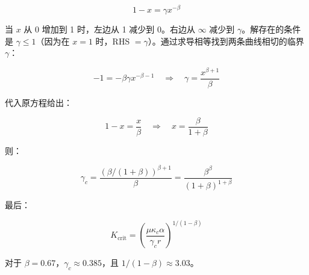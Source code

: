 \documentclass[12pt,a4paper]{article}
\theoremstyle{remark}
\newcommand{\kappac}{\kappa_c}
\begin{document}
		\begin{equation}
			1 - x = \gamma x^{-\beta}
			\label{eq:x-eqn}
		\end{equation}
		
		当 $x$ 从 0 增加到 1 时，左边从 1 减少到 0。右边从 $\infty$ 减少到 $\gamma$。解存在的条件是 $\gamma \leq 1$（因为在 $x=1$ 时，RHS $=\gamma$）。通过求导相等找到两条曲线相切的临界 $\gamma$：
		
		\begin{equation}
			-1 = -\beta \gamma x^{-\beta-1} \quad \Rightarrow \quad \gamma = \frac{x^{\beta+1}}{\beta}
			\label{eq:derivative}
		\end{equation}
		
		代入原方程给出：
		
		\begin{equation}
			1 - x = \frac{x}{\beta} \quad \Rightarrow \quad x = \frac{\beta}{1+\beta}
			\label{eq:x-crit}
		\end{equation}
		
		则：
		
		\begin{equation}
			\gamma_c = \frac{(\beta/(1+\beta))^{\beta+1}}{\beta} = \frac{\beta^{\beta}}{(1+\beta)^{1+\beta}}
			\label{eq:gamma-c-app}
		\end{equation}
		
		最后：
		
		\begin{equation}
			K_{\text{crit}} = \left( \frac{\mu \kappac \alpha}{\gamma_c r} \right)^{1/(1-\beta)}
			\label{eq:Kcrit-app}
		\end{equation}
		
		对于 $\beta = 0.67$，$\gamma_c \approx 0.385$，且 $1/(1-\beta) \approx 3.03$。
		
	
\end{document}
